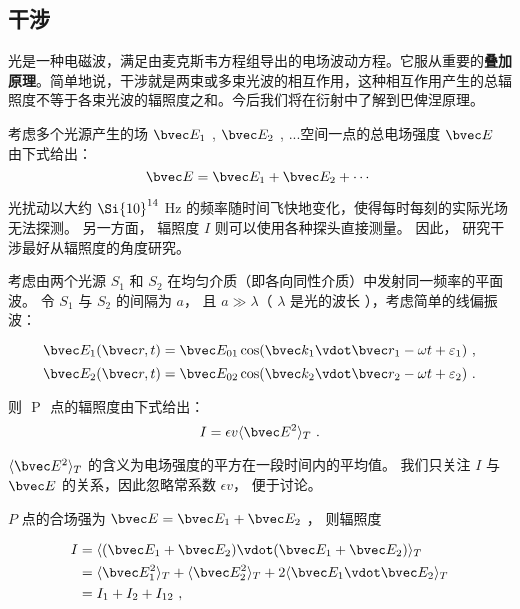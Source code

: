 
\subsection{干涉}

光是一种电磁波，满足由麦克斯韦方程组导出的电场波动方程。它服从重要的\textbf{叠加原理}。简单地说，干涉就是两束或多束光波的相互作用，这种相互作用产生的总辐照度不等于各束光波的辐照度之和。今后我们将在衍射中了解到巴俾涅原理。

考虑多个光源产生的场 $\bvec E_1$ , $\bvec E_2$ , ...空间一点的总电场强度 $\bvec E$ 由下式给出：
\begin{equation}
\bvec E = \bvec E_1 + \bvec E_2 + \cdots~
\end{equation}


光扰动以大约 $\Si{10}^{14}$ Hz 的频率随时间飞快地变化，使得每时每刻的实际光场无法探测。 另一方面， 辐照度 $I$ 则可以使用各种探头直接测量。 因此， 研究干涉最好从辐照度的角度研究。

考虑由两个光源 $S_1$ 和 $S_2$ 在均匀介质（即各向同性介质）中发射同一频率的平面波。 令 $S_1$ 与 $S_2$ 的间隔为 $a$， 且 $ a \gg \lambda $（ $\lambda$ 是光的波长 ），考虑简单的线偏振波：

$$ \bvec E_1 ( \bvec r , t) = \bvec E_{01} \cos (\bvec k_1 \vdot \bvec r_1 - \omega t + \varepsilon_1 )~,$$
$$ \bvec E_2 ( \bvec r , t) = \bvec E_{02} \cos (\bvec k_2 \vdot \bvec r_2 - \omega t + \varepsilon_2 )~.$$

则 $ $ P $ $ 点的辐照度由下式给出：
\begin{equation}
 I = \epsilon v \langle \bvec E^2 \rangle _T ~.
\end{equation}

$\langle \bvec E^2 \rangle _T$ 的含义为电场强度的平方在一段时间内的平均值。 我们只关注 $ I $ 与 $ \bvec E $ 的关系，因此忽略常系数 $ \epsilon v$， 便于讨论。 

 $ P $ 点的合场强为 $ \bvec E = \bvec E_1 + \bvec E_2 $ ， 则辐照度

\begin{equation}   
\begin{aligned}
I &= \langle( \bvec E_1 + \bvec E_2)\vdot( \bvec E_1 + \bvec E_2 )\rangle _T \\
&= \langle \bvec E_1^2 \rangle _T + \langle \bvec E_2^2 \rangle _T + 2\langle \bvec E_1 \vdot \bvec E_2 \rangle _T \\
&= I_1 + I_2 + I_{12}~,
\end{aligned}
\end{equation}



